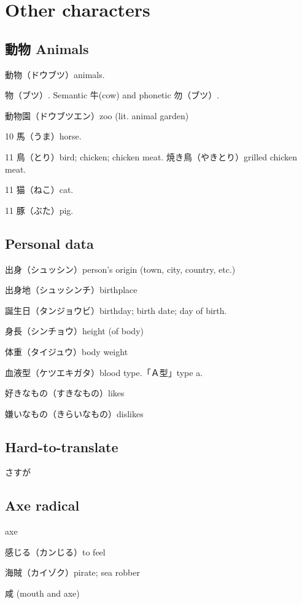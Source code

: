 \chapter{Other characters}

\section{動物 Animals}

動物（ドウブツ）animals.

物（ブツ）.
Semantic 牛(cow) and phonetic 勿（ブツ）.

動物園（ドウブツエン）zoo (lit. animal garden)

10 馬（うま）horse.

11 鳥（とり）bird; chicken; chicken meat.
焼き鳥（やきとり）grilled chicken meat.

11 猫（ねこ）cat.

11 豚（ぶた）pig.

\section{Personal data}

出身（シュッシン）person's origin (town, city, country, etc.)

出身地（シュッシンチ）birthplace

誕生日（タンジョウビ）birthday; birth date; day of birth.

身長（シンチョウ）height (of body)

体重（タイジュウ）body weight

血液型（ケツエキガタ）blood type.「Ａ型」type a.

好きなもの（すきなもの）likes

嫌いなもの（きらいなもの）dislikes

\section{Hard-to-translate}

さすが

\section{Axe radical}

axe

感じる（カンじる）to feel

海賊（カイゾク）pirate; sea robber

咸 (mouth and axe)

